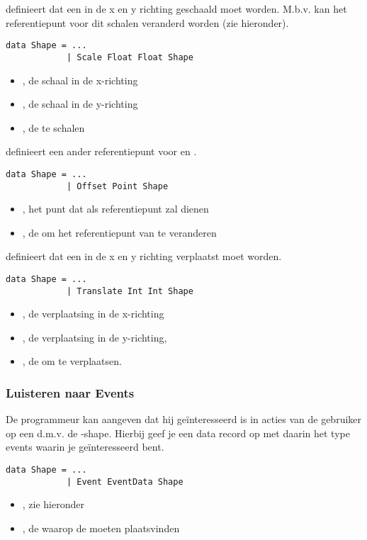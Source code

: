  definieert dat een \shape in de x en y richting geschaald moet worden. M.b.v.  kan het referentiepunt voor dit schalen veranderd worden (zie hieronder).
\begin{lstlisting}
data Shape = ...
			| Scale Float Float Shape
\end{lstlisting}
\begin{itemize}
	\item {}, de schaal in de x-richting
	\item {}, de schaal in de y-richting
	\item {}, de te schalen \shape
\end{itemize}

 definieert een ander referentiepunt voor  en .
\begin{lstlisting}
data Shape = ...
			| Offset Point Shape
\end{lstlisting}
\begin{itemize}
	\item {}, het punt dat als referentiepunt zal dienen
	\item {}, de \shape om het referentiepunt van te veranderen
\end{itemize}

 definieert dat een \shape in de x en y richting verplaatst moet worden.
\begin{lstlisting}
data Shape = ...
			| Translate Int Int Shape
\end{lstlisting}
\begin{itemize}
	\item {}, de verplaatsing in de x-richting
	\item {}, de verplaatsing in de y-richting,
	\item {}, de \shape om te verplaatsen. 
\end{itemize}

\subsubsection{Luisteren naar Events}
De programmeur kan aangeven dat hij geïnteresseerd is in acties van de gebruiker op een \shape d.m.v. de -shape. Hierbij geef je een data record op met daarin het type events waarin je ge\"interesseerd bent.

\begin{lstlisting}
data Shape = ...
			| Event EventData Shape
\end{lstlisting}
\begin{itemize}
	\item {}, zie hieronder
	\item {}, de \shape waarop de \events moeten plaatsvinden
\end{itemize}

